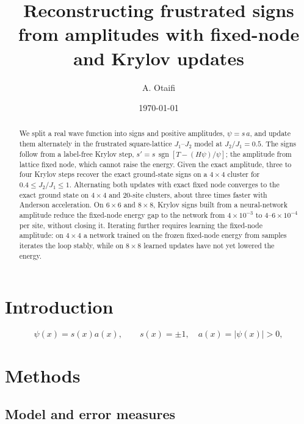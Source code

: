 \documentclass[aps,prb,reprint,superscriptaddress,floatfix]{revtex4-2}
\begin{document}
\title{Reconstructing frustrated signs from amplitudes with fixed-node and Krylov updates}

\author{A. Otaifi}
\date{\today}

\begin{abstract}
We split a real wave function into signs and positive amplitudes,
$\psi=s\,a$, and update them alternately in the frustrated square-lattice
$J_1$--$J_2$ model at $J_2/J_1=0.5$. The signs follow from a label-free
Krylov step, $s'=s\,\operatorname{sgn}[T-(H\psi)/\psi]$; the amplitude from
lattice fixed node, which cannot raise the energy. Given the exact amplitude,
three to four Krylov steps recover the exact ground-state signs on a
$4\times4$ cluster for $0.4\leq J_2/J_1\leq1$. Alternating both updates with
exact fixed node converges to the exact ground state on $4\times4$ and
20-site clusters, about three times faster with Anderson acceleration. On
$6\times6$ and $8\times8$, Krylov signs built from a neural-network amplitude
reduce the fixed-node energy gap to the network from $4\times10^{-3}$ to
$4$--$6\times10^{-4}$ per site, without closing it. Iterating further requires
learning the fixed-node amplitude: on $4\times4$ a network trained on the frozen
fixed-node energy from samples iterates the loop stably, while on $8\times8$
learned updates have not yet lowered the energy.
\end{abstract}

\maketitle

\section{Introduction}

\begin{equation}
\psi(x)=s(x)a(x),\qquad s(x)=\pm1,\quad a(x)=|\psi(x)|>0,
\label{eq:decomp}
\end{equation}

\section{Methods}
\label{sec:methods}

\subsection{Model and error measures}
\end{document}
